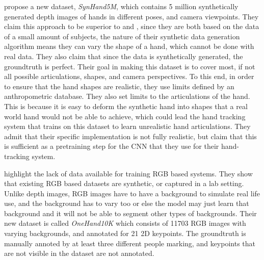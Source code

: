 \cite{malik2018deephps} propose a new dataset, {\slshape SynHand5M}, which contains 5 million synthetically generated depth images of hands in different poses, and camera viewpoints. They claim this approach to be superior to \cite{yuan2017bighand2} and \cite{romero2017embodied}, since they are both based on the data of a small amount of subjects, the nature of their synthetic data generation algorithm means they can vary the shape of a hand, which cannot be done with real data. They also claim that since the data is synthetically generated, the groundtruth is perfect. Their goal in making this dataset is to cover most, if not all possible articulations, shapes, and camera perspectives. To this end, in order to ensure that the hand shapes are realistic, they use limits defined by an anthropometric database. They also set limits to the articulations of the hand. This is because it is easy to deform the synthetic hand into shapes that a real world hand would not be able to achieve, which could lead the hand tracking system that trains on this dataset to learn unrealistic hand articulations. They admit that their specific implementation is not fully realistic, but claim that this is sufficient as a pretraining step for the CNN that they use for their hand-tracking system.

\cite{wang2018mask} highlight the lack of data available for training RGB based systems. They show that existing RGB based datasets are synthetic, or captured in a lab setting. Unlike depth images, RGB images have to have a background to simulate real life use, and the background has to vary too or else the model may just learn that background and it will not be able to segment other types of backgrounds. Their new dataset is called {\slshape OneHand10K} which consists of 11703 RGB images with varying backgrounds, and annotated for 21 2D keypoints. The groundtruth is manually annoted by at least three different people marking, and keypoints that are not visible in the dataset are not annotated.

